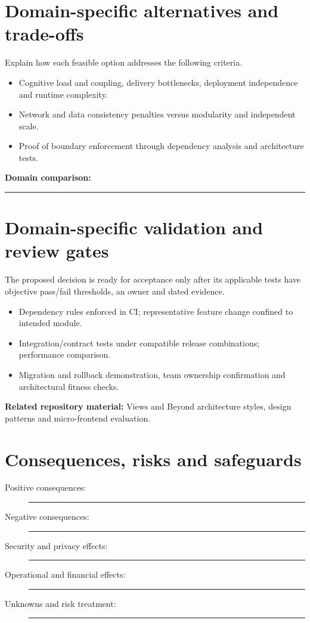 \documentclass[11pt,letterpaper]{article}
\newcommand{\BlankResponse}{\rule[-0.4em]{0pt}{2em}\rule{0.65\linewidth}{0.4pt}}
\begin{document}
\section{Domain-specific alternatives and trade-offs}
Explain how each feasible option addresses the following criteria.
\begin{itemize}
\item Cognitive load and coupling, delivery bottlenecks, deployment independence and runtime complexity.
\item Network and data consistency penalties versus modularity and independent scale.
\item Proof of boundary enforcement through dependency analysis and architecture tests.
\end{itemize}
\noindent\textbf{Domain comparison:} \BlankResponse
\section{Domain-specific validation and review gates}
The proposed decision is ready for acceptance only after its applicable
tests have objective pass/fail thresholds, an owner and dated evidence.
\begin{itemize}
\item Dependency rules enforced in CI; representative feature change confined to intended module.
\item Integration/contract tests under compatible release combinations; performance comparison.
\item Migration and rollback demonstration, team ownership confirmation and architectural fitness checks.
\end{itemize}
\noindent\textbf{Related repository material:} Views and Beyond architecture styles, design patterns and micro-frontend evaluation.

\section{Consequences, risks and safeguards}
\begin{description}
\item[Positive consequences:] \BlankResponse
\item[Negative consequences:] \BlankResponse
\item[Security and privacy effects:] \BlankResponse
\item[Operational and financial effects:] \BlankResponse
\item[Unknowns and risk treatment:] \BlankResponse
\end{description}
\end{document}
